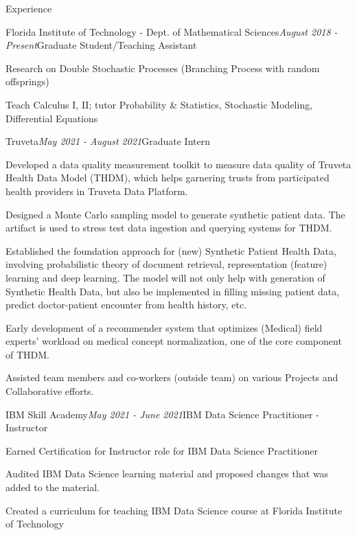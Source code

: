 \documentclass{resume} %
\begin{document}
\begin{rSection}{Experience}

    \begin{rSubsection}{Florida Institute of Technology - Dept. of Mathematical Sciences}{\em August 2018 - Present}{Graduate Student/Teaching Assistant}{}
        \item Research on Double Stochastic Processes (Branching Process with random offsprings)
        \item Teach Calculus I, II; tutor Probability \& Statistics, Stochastic Modeling, Differential Equations
    \end{rSubsection}

    \begin{rSubsection}{Truveta}{\em May 2021 - August 2021}{Graduate Intern}{}
            \item Developed a data quality measurement toolkit to measure data quality of Truveta Health Data Model (THDM), which helps garnering trusts from participated health providers in Truveta Data Platform.
            \item Designed a Monte Carlo sampling model to generate synthetic patient data. The artifact is used to stress test data ingestion and querying systems for THDM.
            \item Established the foundation approach for (new) Synthetic Patient Health Data, involving probabilistic theory of document retrieval, representation (feature) learning and deep learning. The model will not only help with generation of Synthetic Health Data, but also be implemented in filling missing patient data, predict doctor-patient encounter from health history, etc.
            \item Early development of a recommender system that optimizes (Medical) field experts' workload on medical concept normalization, one of the core component of THDM.
            \item Assisted team members and co-workers (outside team) on various Projects and Collaborative efforts.
    \end{rSubsection}

    \begin{rSubsection}{IBM Skill Academy}{\em May 2021 - June 2021}{IBM Data Science Practitioner - Instructor}{}
        \item Earned Certification for Instructor role for IBM Data Science Practitioner
        \item Audited IBM Data Science learning material and proposed changes that was added to the material.
        \item Created a curriculum for teaching IBM Data Science course at Florida Institute of Technology
    \end{rSubsection}
    

\end{rSection}
\end{document}
